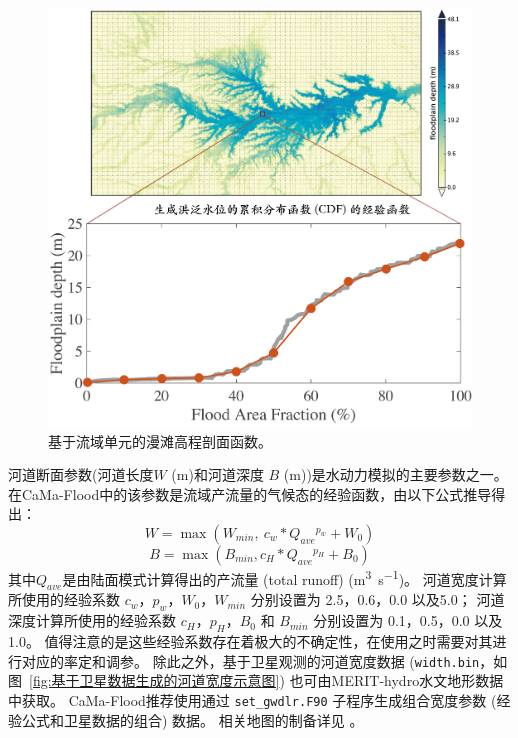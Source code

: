 {
\begin{figure}[htbp]
\centering
\includegraphics[width=1.0\textwidth]{Figures/陆地表面的水分循环/基于流域单元的漫滩高程剖面函数.png}
\caption{基于流域单元的漫滩高程剖面函数。}
\label{fig:基于流域单元的漫滩高程剖面函数}
\end{figure}
}


河道断面参数(河道长度$W$ (m)和河道深度 $B$ (m))是水动力模拟的主要参数之一。在CaMa-Flood中的该参数是流域产流量的气候态的经验函数，由以下公式推导得出：
\begin{equation}
W=\max \left(W_{min},\ c_{w} * Q_{ave}{}^{p_{w}}+W_{0}\right)
\end{equation}
\begin{equation}
B=\max \left(B_{min}, c_{H} * Q_{ave}{}^{p_{H}}+B_{0}\right)
\end{equation}
其中$Q_{ave}$是由陆面模式计算得出的产流量 (total runoff) (\unit{m^3.s^{-1}})。
河道宽度计算所使用的经验系数 $c_w$，$p_w$，$W_0$，$W_{min}$ 分别设置为 2.5，0.6，0.0 以及5.0；
河道深度计算所使用的经验系数 $c_H$，$p_H$，$B_0$ 和 $B_{min}$ 分别设置为 0.1，0.5，0.0 以及1.0。
值得注意的是这些经验系数存在着极大的不确定性，在使用之时需要对其进行对应的率定和调参。
除此之外，基于卫星观测的河道宽度数据 (\texttt{width.bin}，如图~\ref{fig:基于卫星数据生成的河道宽度示意图}) 也可由MERIT-hydro水文地形数据中获取。
CaMa-Flood推荐使用通过 \texttt{set\_gwdlr.F90} 子程序生成组合宽度参数 (经验公式和卫星数据的组合) 数据。
相关地图的制备详见 \citet{yamazaki2014regional, yamazaki2014development}。

